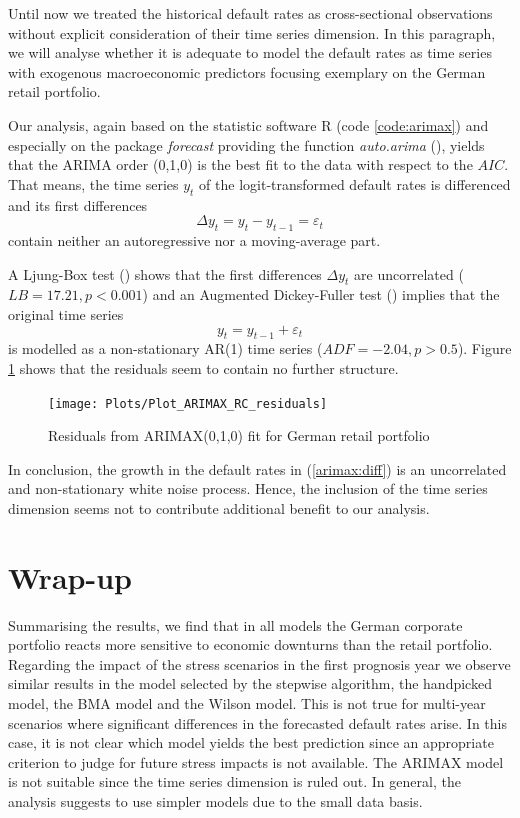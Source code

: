 \documentclass[a4paper, 11pt]{scrreprt}
\begin{document}
Until now we treated the historical default rates as cross-sectional observations without explicit consideration of their time series dimension. In this paragraph, we will analyse whether it is adequate to model the default rates as time series with exogenous macroeconomic predictors focusing exemplary on the German retail portfolio.


Our analysis, again based on the statistic software R (code \ref{code:arimax}) and especially on the package \textit{forecast} providing the function \textit{auto.arima} (\textcite{hyndman2017forecast}), yields that the ARIMA order (0,1,0) is the best fit to the data with respect to the $AIC$.
That means, the time series $y_t$ of the logit-transformed default rates is differenced and its first differences 
\begin{equation}
\Delta y_t = y_t - y_{t-1} = \varepsilon_t
\end{equation}
contain neither an autoregressive nor a moving-average part.

A Ljung-Box test (\textcite{ljung1978measure}) shows that the first differences $\Delta y_t$ are uncorrelated ($LB = 17.21, p< 0.001$) and an Augmented Dickey-Fuller test
(\textcite{dickey1979distribution}) implies that the original time series 
\begin{equation}\label{arimax:diff}
y_t = y_{t-1} + \varepsilon_t
\end{equation}
is modelled as a non-stationary AR(1) time series ($ADF = -2.04, p > 0.5$). 
Figure \ref{plot:ARIMAX_RC_residuals} shows that the residuals seem to contain no further structure.

\begin{figure}[H]
	\texttt{[image: Plots/Plot\_ARIMAX\_RC\_residuals]}
	\centering
	\caption{Residuals from ARIMAX(0,1,0) fit for German retail portfolio}
	\label{plot:ARIMAX_RC_residuals}
\end{figure}

\bigskip

In conclusion, the growth in the default rates in (\ref{arimax:diff}) is an uncorrelated and non-stationary white noise process. Hence, the inclusion of the time series dimension seems not to contribute additional benefit to our analysis.

\section{Wrap-up}

Summarising the results, we find that in all models the German corporate portfolio reacts more sensitive to economic downturns than the retail portfolio. Regarding the impact of the stress scenarios in the first prognosis year we observe similar results in the model selected by the stepwise algorithm, the handpicked model, the BMA model and the Wilson model. This is not true for multi-year scenarios where significant differences in the forecasted default rates arise.
In this case, it is not clear which model yields the best prediction since an appropriate criterion to judge for future stress impacts is not available.
The ARIMAX model is not suitable since the time series dimension is ruled out.
In general, the analysis suggests to use simpler models due to the small data basis.
\end{document}
